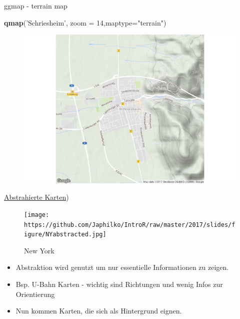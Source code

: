 \documentclass[ignorenonframetext,]{beamer}
\newenvironment{Shaded}{}{}
\newcommand{\KeywordTok}[1]{\textcolor[rgb]{0.00,0.44,0.13}{\textbf{{#1}}}}
\newcommand{\DataTypeTok}[1]{\textcolor[rgb]{0.56,0.13,0.00}{{#1}}}
\newcommand{\DecValTok}[1]{\textcolor[rgb]{0.25,0.63,0.44}{{#1}}}
\newcommand{\StringTok}[1]{\textcolor[rgb]{0.25,0.44,0.63}{{#1}}}
\newcommand{\NormalTok}[1]{{#1}}
\providecommand{\tightlist}{%
\setlength{\itemsep}{0pt}\setlength{\parskip}{0pt}}
\begin{document}
\begin{frame}[fragile]{ggmap - terrain map}

\begin{Shaded}
\begin{Highlighting}[]
\KeywordTok{qmap}\NormalTok{(}\StringTok{'Schriesheim'}\NormalTok{, }\DataTypeTok{zoom =} \DecValTok{14}\NormalTok{,}\DataTypeTok{maptype=}\StringTok{"terrain"}\NormalTok{)}
\end{Highlighting}
\end{Shaded}

\begin{figure}[htbp]
\centering
\includegraphics{RSocialScience2_files/figure-beamer/unnamed-chunk-40-1.pdf}
\caption{}
\end{figure}

\end{frame}

\begin{frame}{\href{http://www.designfaves.com/2014/03/abstracted-maps-reveal-cities-personalities}{Abstrahierte
Karten})}

\begin{figure}[htbp]
\centering
\texttt{[image: https://github.com/Japhilko/IntroR/raw/master/2017/slides/figure/NYabstracted.jpg]}
\caption{New York}
\end{figure}

\begin{itemize}
\tightlist
\item
  Abstraktion wird genutzt um nur essentielle Informationen zu zeigen.
\item
  Bsp. U-Bahn Karten - wichtig sind Richtungen und wenig Infos zur
  Orientierung
\item
  Nun kommen Karten, die sich als Hintergrund eignen.
\end{itemize}

\end{frame}
\end{document}
